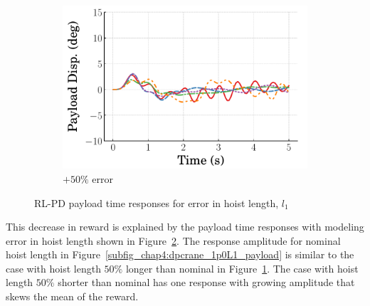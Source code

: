 \begin{figure}[tb]
\begin{subfigure}[b]{0.32\textwidth}
        \includegraphics[width=\textwidth]{figures/figures_robustness/dpcrane_robustness/time_responses/1p5L1_payload.pdf}
        \caption{$+50\%$ error}
        \label{subfig_chap4:dpcrane_1p5L1_payload}
    \end{subfigure}
    \caption{RL-PD payload time responses for error in hoist length, $l_1$}
    \label{fig_chap4:dpcrane_hoist_error_responses}
  \end{figure}
%
This decrease in reward is explained by the payload time responses with modeling error in hoist length shown in Figure~\ref{fig_chap4:dpcrane_hoist_error_responses}. The response amplitude for nominal hoist length in Figure~\ref{subfig_chap4:dpcrane_1p0L1_payload} is similar to the case with hoist length $50\%$ longer than nominal in Figure~\ref{subfig_chap4:dpcrane_1p5L1_payload}. The case with hoist length $50\%$ shorter than nominal has one response with growing amplitude that skews the mean of the reward.

